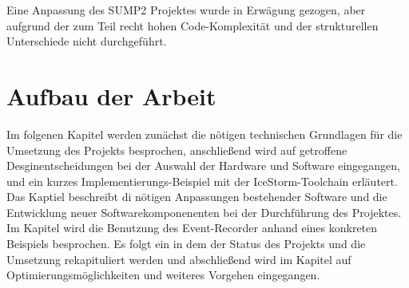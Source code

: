 Eine Anpassung des SUMP2 Projektes wurde in Erwägung gezogen, aber aufgrund der zum Teil recht hohen Code-Komplexität und der strukturellen Unterschiede nicht durchgeführt.


\section{Aufbau der Arbeit}
\label{ch:Einfuehrung:Aufbau}

Im folgenen Kapitel  werden zunächst die nötigen technischen Grundlagen für die Umsetzung des Projekts besprochen, anschließend wird auf getroffene Desginentscheidungen bei der Auswahl der Hardware und Software eingegangen, und ein kurzes Implementierungs-Beispiel mit der IceStorm-Toolchain erläutert.
Das Kaptiel  beschreibt di nötigen Anpassungen bestehender Software und die Entwicklung neuer Softwarekomponenenten bei der Durchführung des Projektes.
Im Kapitel  wird die Benutzung des Event-Recorder anhand eines konkreten Beispiels besprochen.
Es folgt ein  in dem der Status des Projekts und die Umsetzung rekapituliert werden und abschließend wird im Kapitel  auf Optimierungsmöglichkeiten und weiteres Vorgehen eingegangen.





